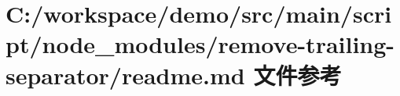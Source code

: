 \hypertarget{node__modules_2remove-trailing-separator_2_r_e_a_d_m_e_8md}{}\section{C\+:/workspace/demo/src/main/script/node\+\_\+modules/remove-\/trailing-\/separator/readme.md 文件参考}
\label{node__modules_2remove-trailing-separator_2_r_e_a_d_m_e_8md}
